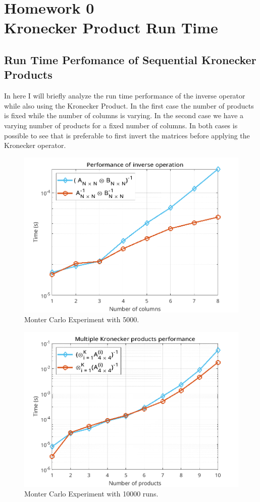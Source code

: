 \documentclass[a4paper,10pt]{article}
\begin{document}

\thispagestyle{empty}

\newpage

\thispagestyle{empty}

\newpage
\section*{Homework 0 \\ Kronecker Product Run Time}

    \subsection*{Run Time Perfomance of Sequential Kronecker Products}

    In here I will briefly analyze the run time performance of the inverse operator while also using the Kronecker Product. In the first case the number of products is fixed while the number of columns is varying. 
    In the second case we have a varying number of products for a fixed number of columns. In both cases is possible to see that is preferable to first invert the matrices before applying the Kronecker operator.  
    
    \begin{figure}[ht!]
        \centering 
        \includegraphics[width=0.75\linewidth]{figs/hw0a1.png} \par 
        \caption{Monter Carlo Experiment with 5000.}
        \label{fig:hw0a1} 
    \end{figure}

    \begin{figure}[ht!]
        \centering 
        \includegraphics[width=0.75\linewidth]{figs/hw0a2.png} \par 
        \caption{Monter Carlo Experiment with 10000 runs.}
        \label{fig:hw0a2} 
    \end{figure}
\end{document}

